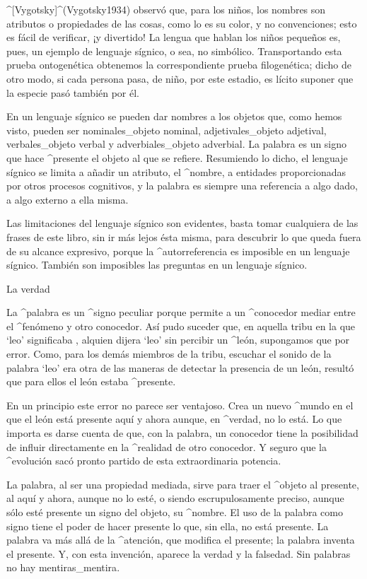 ^[Vygotsky]^(Vygotsky1934) observó que, para los niños, los nombres son
atributos o propiedades de las cosas, como lo es su color, y no
convenciones; esto es fácil de verificar, ¡y divertido! La lengua que
hablan los niños pequeños es, pues, un ejemplo de lenguaje sígnico, o
sea, no simbólico. Transportando esta prueba ontogenética obtenemos la
correspondiente prueba filogenética; dicho de otro modo, si cada persona
pasa, de niño, por este estadio, es lícito suponer que la especie pasó
también por él.

En un lenguaje sígnico se pueden dar nombres a los objetos que, como
hemos visto, pueden ser nominales_{objeto nominal}, adjetivales_{objeto
adjetival}, verbales_{objeto verbal} y adverbiales_{objeto adverbial}.
La palabra es un signo que hace ^{presente} el objeto al que se refiere.
Resumiendo lo dicho, el lenguaje sígnico se limita a añadir un atributo,
el ^{nombre}, a entidades proporcionadas por otros procesos cognitivos,
y la palabra es siempre una referencia a algo dado, a algo externo a
ella misma.

Las limitaciones del lenguaje sígnico son evidentes, basta tomar
cualquiera de las frases de este libro, sin ir más lejos ésta misma,
para descubrir lo que queda fuera de su alcance expresivo, porque la
^{autorreferencia} es imposible en un lenguaje sígnico. También son
imposibles las preguntas en un lenguaje sígnico.


\Section La verdad

La ^{palabra} es un ^{signo} peculiar porque permite a un ^{conocedor}
mediar entre el ^{fenómeno} y otro conocedor. Así pudo suceder que, en
aquella tribu en la que `leo' significaba , alquien dijera
`leo' sin percibir un ^{león}, supongamos que por error. Como, para los
demás miembros de la tribu, escuchar el sonido de la palabra `leo' era
otra de las maneras de detectar la presencia de un león, resultó que
para ellos el león estaba ^{presente}.

En un principio este error no parece ser ventajoso. Crea un nuevo
^{mundo} en el que el león está presente aquí y ahora aunque, en
^{verdad}, no lo está. Lo que importa es darse cuenta de que, con la
palabra, un conocedor tiene la posibilidad de influir directamente en la
^{realidad} de otro conocedor. Y seguro que la ^{evolución} sacó pronto
partido de esta extraordinaria potencia.

La palabra, al ser una propiedad mediada, sirve para traer el ^{objeto}
al presente, al aquí y ahora, aunque no lo esté, o siendo
escrupulosamente preciso, aunque sólo esté presente un signo del objeto,
su ^{nombre}. El uso de la palabra como signo tiene el poder de hacer
presente lo que, sin ella, no está presente. La palabra va más allá de
la ^{atención}, que modifica el presente; la palabra inventa el
presente. Y, con esta invención, aparece la verdad y la falsedad. Sin
palabras no hay mentiras_{mentira}.


